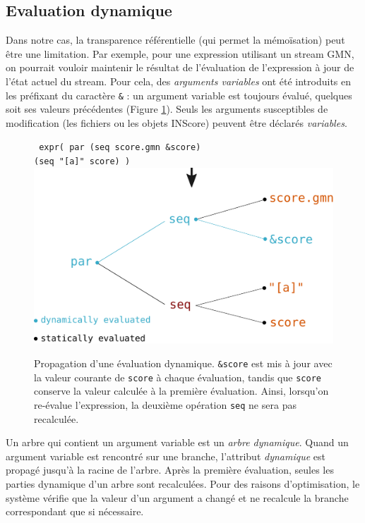 \documentclass{article}
\newcommand{\OSC}[1]{\texttt{#1}}
\newcommand{\oper}[1]{\textcolor{figRed}{#1}}
\newcommand{\param}[1]{\textcolor{figOrange}{#1}}
\newcommand{\prefix}[1]{\textcolor{figBlue}{#1}}
\newcommand{\tab}{\hspace*{4mm}}
\begin{document}
\subsection{Evaluation dynamique}

Dans notre cas, la transparence référentielle (qui permet la mémoïsation) peut être une limitation. Par exemple, pour une expression utilisant un stream GMN, on pourrait vouloir maintenir le résultat de l'évaluation de l'expression à jour de l'état actuel du stream. Pour cela, des \emph{arguments variables} ont été introduits en les préfixant du caractère \OSC{\&} : un argument variable est toujours évalué, quelques soit ses valeurs précédentes (Figure \ref{fig:dynamicEval}). Seuls les arguments susceptibles de modification (les fichiers ou les objets INScore) peuvent être déclarés \emph{variables}.

\begin{figure}[th]
\centering
\OSC{ expr( \oper{par} (\oper{seq} \param{score.gmn} \prefix{\&}\param{score}) \\
 \tab\tab\tab\tab (\oper{seq} \param{"[a]" score}) )}
\includegraphics[width=0.9\columnwidth]{imgs/dynamicEval}
\caption{Propagation d'une évaluation dynamique. \OSC{\prefix{\&}\param{score}} est mis à jour avec la valeur courante de \OSC{score} à chaque évaluation, tandis que \OSC{\param{score}} conserve la valeur calculée à la première évaluation. Ainsi, lorsqu'on re-évalue l'expression, la deuxième opération \OSC{\oper{seq}} ne sera pas recalculée. 
}
\label{fig:dynamicEval}
\end{figure}

Un arbre qui contient un argument variable est un \emph{arbre dynamique}. Quand un argument variable est rencontré sur une branche, l'attribut \emph{dynamique} est propagé jusqu'à la racine de l'arbre. Après la première évaluation, seules les parties dynamique d'un arbre sont recalculées. Pour des raisons d'optimisation, le système vérifie que la valeur d'un argument a changé et ne recalcule la branche correspondant que si nécessaire.
\end{document}
